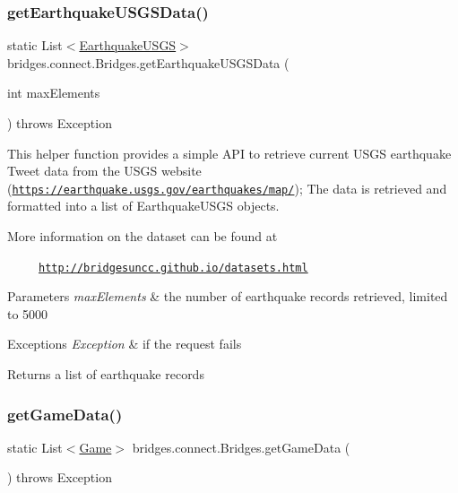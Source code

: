 \subsubsection{\texorpdfstring{get\+Earthquake\+U\+S\+G\+S\+Data()}{getEarthquakeUSGSData()}}
{\footnotesize\ttfamily static List$<$\mbox{\hyperlink{classbridges_1_1data__src__dependent_1_1_earthquake_u_s_g_s}{Earthquake\+U\+S\+GS}}$>$ bridges.\+connect.\+Bridges.\+get\+Earthquake\+U\+S\+G\+S\+Data (\begin{DoxyParamCaption}\item[{int}]{max\+Elements }\end{DoxyParamCaption}) throws Exception\hspace{0.3cm}{\ttfamily [static]}}

This helper function provides a simple A\+PI to retrieve current U\+S\+GS earthquake Tweet data from the U\+S\+GS website (\href{https://earthquake.usgs.gov/earthquakes/map/}{\tt https\+://earthquake.\+usgs.\+gov/earthquakes/map/}); The data is retrieved and formatted into a list of Earthquake\+U\+S\+GS objects.

More information on the dataset can be found at 

~~~~~\href{http://bridgesuncc.github.io/datasets.html}{\tt http\+://bridgesuncc.\+github.\+io/datasets.\+html} 


\begin{DoxyParams}{Parameters}
{\em max\+Elements} & the number of earthquake records retrieved, limited to 5000 \\
\hline
\end{DoxyParams}

\begin{DoxyExceptions}{Exceptions}
{\em Exception} & if the request fails\\
\hline
\end{DoxyExceptions}
\begin{DoxyReturn}{Returns}
a list of earthquake records 
\end{DoxyReturn}
\mbox{\label{classbridges_1_1connect_1_1_bridges_a594808b9dada5c825ac00ae0c97c9e9b}} 
\subsubsection{\texorpdfstring{get\+Game\+Data()}{getGameData()}}
{\footnotesize\ttfamily static List$<$\mbox{\hyperlink{classbridges_1_1data__src__dependent_1_1_game}{Game}}$>$ bridges.\+connect.\+Bridges.\+get\+Game\+Data (\begin{DoxyParamCaption}{ }\end{DoxyParamCaption}) throws Exception\hspace{0.3cm}{\ttfamily [static]}}

